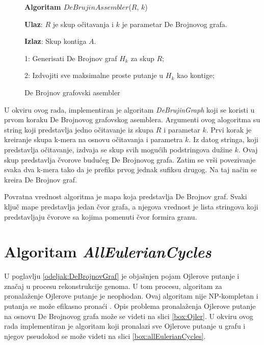 \documentclass[12pt,oneside]{memoir}
\begin{document}
\begin{figure}[!ht]
\begin{tcolorbox}
\textbf{Algoritam $DeBrujinAssembler$}($R$, $k$)

\textbf{Ulaz}: $R$ je skup očitavanja i $k$ je parametar De Brojnovog grafa.

\textbf{Izlaz}: Skup kontiga $A$.

1: Generisati De Brojnov graf $H_k$ za skup $R$;

2: Izdvojiti sve maksimalne proste putanje u $H_k$ kao kontige;

\end{tcolorbox}
\caption{De Brojnov grafovski asembler \cite{WingKinSung}}
\label{box:DeBrujinAssembler}
\end{figure}

U okviru ovog rada, implementiran je algoritam \textit{DeBrujinGraph} koji se koristi u prvom koraku De Brojnovog grafovskog asemblera. Argumenti ovog alogoritma su string koji predstavlja jedno očitavanje iz skupa $R$ i parametar $k$. Prvi korak je kreiranje skupa k-mera na osnovu očitavanja i parametra $k$. Iz datog stringa, koji predstavlja očitavanje, izdvaja se skup svih mogućih podstringova dužine $k$. Ovaj skup predstavlja čvorove budućeg De Brojnovog grafa. Zatim se vrši povezivanje svaka dva k-mera tako da je prefiks prvog jednak sufiksu drugog. Na taj način se kreira De Brojnov graf.

Povratna vrednost algoritma je mapa koja predstavlja De Brojnov graf. Svaki ključ mape predstavlja jedan čvor grafa, a njegova vrednost je lista stringova koji predstavljaju čvorove sa kojima pomenuti čvor formira granu.

\section{Algoritam \textit{AllEulerianCycles}}

U poglavlju \ref{odeljak:DeBrojnovGraf} je objašnjen pojam  Ojlerove putanje i značaj u procesu rekonstrukcije genoma. U tom procesu, algoritam za pronalaženje Ojlerove putanje je neophodan. Ovaj algoritam nije NP-kompletan i putanja se može efikasno pronaći \cite{skriptaBio}. Opis problema pronalaženja Ojlerove putanje na osnovu De Brojnovog grafa može se videti na slici \ref{box:Ojler}. U okviru ovog rada implementiran je algoritam koji pronalazi sve Ojlerove putanje u grafu i njegov pseudokod se može videti na slici \ref{box:allEulerianCycles}. 
\vspace{0.2cm}
\end{document}
